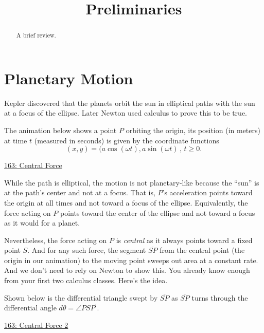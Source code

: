 \documentclass{ximera}
\title{Preliminaries}
\begin{document}
\begin{abstract}
A brief review.
\end{abstract}
\maketitle


\section*{Planetary Motion}
Kepler discovered that the planets orbit the sun in elliptical paths with the sun at a focus of the ellipse. Later Newton used calculus to prove this to be true. 

The animation below shows a point $P$ orbiting the origin, its position (in meters) at time $t$ (measured in seconds) is given by the coordinate functions
\[
       (x,y) = (a \cos (\omega t), a \sin(\omega t) \, , \, t \geq 0.
\]

\begin{exploration}
\begin{onlineOnly}
    \begin{center}
\end{center}
\end{onlineOnly}

\href{https://www.desmos.com/calculator/5aq0sta5aa}{163: Central Force}
\end{exploration}


While the path is elliptical, the motion is not planetary-like because the ``sun'' is at the path's center and not at a focus. That is,  $P$'s acceleration points toward the origin at all times and not toward a focus of the ellipse. Equivalently, the force acting on $P$ points toward the center of the ellipse and not toward a focus as it would for a planet. %

Nevertheless, the force acting on $P$ is \emph{central} as it always points toward a fixed point $S$. And for any such force, the segment $\overline{SP}$ from the central point (the origin in our animation) to the moving point sweeps out area at a constant rate. And we don't need to rely on Newton to show this. You already know enough from your first two calculus classes. Here's the idea.


\begin{exploration}
Shown below is the differential triangle swept by $\overline{SP}$ as $\overline{SP}$ turns through the differential angle $d\theta = \angle PSP^\prime$.
\begin{onlineOnly}
    \begin{center}
\end{center}
\end{onlineOnly}

\href{https://www.desmos.com/calculator/vtvt8znhxu}{163: Central Force 2}
\end{exploration}
\end{document}
